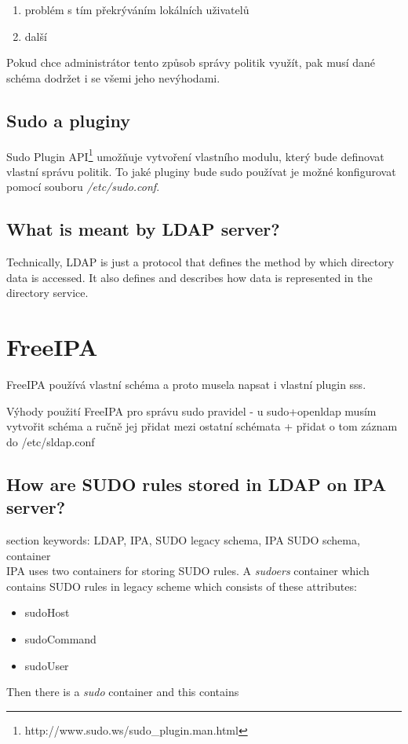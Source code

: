 \documentclass[12pt,a4paper,titlepage,final]{article}
\begin{document}
\begin{enumerate} 
	\item problém s	tím překrýváním lokálních uživatelů 
	\item další
\end{enumerate}

Pokud chce administrátor tento způsob správy politik využít, pak musí dané
schéma dodržet i se všemi jeho nevýhodami.

\subsection{Sudo a pluginy}
Sudo Plugin API\footnote{http://www.sudo.ws/sudo\_plugin.man.html}
umožňuje vytvoření vlastního modulu, který bude definovat vlastní správu
politik.  To jaké pluginy bude sudo používat je možné konfigurovat pomocí
souboru \textit{/etc/sudo.conf}.


\subsection{What is meant by LDAP server?}
Technically, LDAP is just a protocol that defines the method by which directory
data is accessed. It also defines and describes how data is represented in the
directory service.


\section{FreeIPA}
FreeIPA používá vlastní schéma a proto musela napsat i vlastní plugin sss.

Výhody použití FreeIPA pro správu sudo pravidel - u sudo+openldap musím vytvořit
schéma a ručně jej přidat mezi ostatní schémata + přidat o tom záznam do
/etc/sldap.conf

\subsection{How are SUDO rules stored in LDAP on IPA server?}
{\Large{section keywords:} LDAP, IPA, SUDO legacy schema, IPA SUDO schema,
container}
\\
IPA uses two containers for storing SUDO rules. A \emph{sudoers} container
which contains SUDO rules in legacy scheme which consists of these attributes:
\begin{itemize}
	\item sudoHost
	\item sudoCommand
	\item sudoUser
\end{itemize}
Then there is a \emph{sudo} container and this contains 
\end{document}
